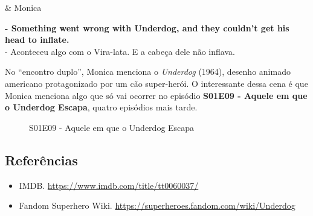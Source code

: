 \begin{tcolorbox}[enhanced,center upper,
    drop fuzzy shadow southeast, boxrule=0.3pt,
    lower separated=false,
    colframe=black!30!dialogoBorder,colback=white]
\begin{minipage}[c]{0.14\linewidth}
   & \centering \scriptsize{Monica}
\end{minipage}
\hspace{.1mm}
\begin{minipage}[c]{0.8\linewidth}
  \textbf{- Something went wrong with Underdog, and they couldn't get his head to inflate.}\\
  - Aconteceu algo com o Vira-lata. E a cabeça dele não inflava.
\end{minipage}
\end{tcolorbox}

No ``encontro duplo'', Monica menciona o \emph{Underdog} (1964), desenho
animado americano protagonizado por um cão super-herói. O interessante
dessa cena é que Monica menciona algo que só vai ocorrer no episódio
\textbf{\textcolor{primarycolor}{S01E09 - Aquele em que o Underdog Escapa}},
quatro episódios mais tarde.

\begin{figure}
  \centering
    \caption{S01E09 - Aquele em que o Underdog Escapa\label{fig:s01-e09-aquele-em-que-o-underdog-escapa}}
\end{figure}

\hypertarget{referuxeancias-1}{%
\subsection{Referências}\label{referuxeancias-1}}

\begin{itemize}
\tightlist
\item
  \sloppy IMDB. \url{https://www.imdb.com/title/tt0060037/}
\item
  \sloppy Fandom Superhero Wiki. \url{https://superheroes.fandom.com/wiki/Underdog}
\end{itemize}

